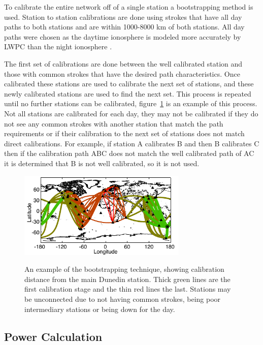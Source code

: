 To calibrate the entire network off of a single station a bootstrapping method is used.
Station to station calibrations are done using strokes that have all day paths to both stations and are within 1000-8000 km of both stations.
All day paths were chosen as the daytime ionosphere is modeled more accurately by LWPC than the night ionosphere \citep{McRae2000d}.

The first set of calibrations are done between the well calibrated station and those with common strokes that have the desired path characteristics.
Once calibrated these stations are used to calibrate the next set of stations, and these newly calibrated stations are used to find the next set.
This process is repeated until no further stations can be calibrated, figure~\ref{bootstrap} is an example of this process.
Not all stations are calibrated for each day, they may not be calibrated if they do not see any common strokes with another station that match the path requirements or if their calibration to the next set of stations does not match direct calibrations.
For example, if station A calibrates B and then B calibrates C then if the calibration path ABC does not match the well calibrated path of AC it is determined that B is not well calibrated, so it is not used.

 \begin{figure}[t]
 \noindent\includegraphics[width=19pc,angle=0]{energy/Figures/PPS_Hop.pdf}\\
 \caption{An example of the bootstrapping technique, showing calibration distance from the main Dunedin station. Thick green lines are the first calibration stage and the thin red lines the last. Stations may be unconnected due to not having common strokes, being poor intermediary stations or being down for the day.}
 \label{bootstrap}
 \end{figure}

\subsection{Power Calculation}

